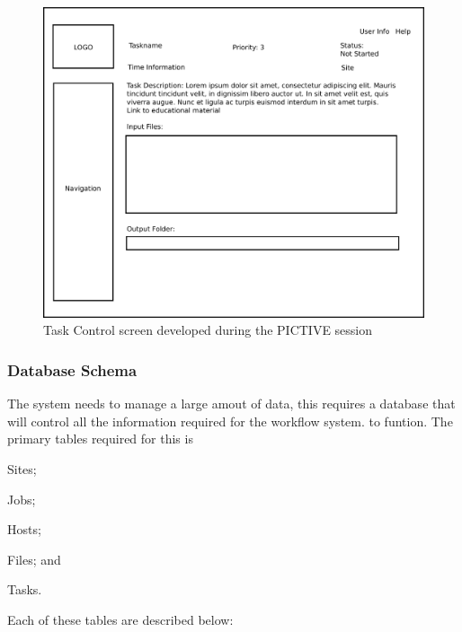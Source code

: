 \documentclass[12pt,a4paper]{report}
\begin{document}
\begin{figure}[!h]
    \begin{center}
        \includegraphics[scale=0.25]{figures/task_overview.pdf}
    \end{center}
    \caption{Task Control screen developed during the PICTIVE session}
    \label{pictive_task}
\end{figure}

\subsubsection{Database Schema\label{db_schema}}
The system needs to manage a large amout of data, this requires
a database that will control all the information required for the
workflow system. to funtion. The primary tables required for this is
\begin{inparaenum}[(i)]
\item Sites;
\item Jobs;
\item Hosts;
\item Files; and
\item Tasks.
\end{inparaenum}

\noindent Each of these tables are described below:
\newpage
\end{document}
